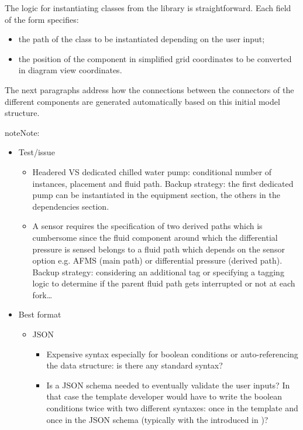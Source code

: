 \documentclass[letterpaper,10pt, openany,english]{sphinxmanual}
\begin{document}
The logic for instantiating classes from the library is straightforward. Each field of the form specifies:
\begin{itemize}
\item {} 
the path of the class to be instantiated depending on the user input;

\item {} 
the position of the component in simplified grid coordinates to be converted in diagram view coordinates.

\end{itemize}

The next paragraphs address how the connections between the connectors of the different components are generated automatically based on this initial model structure.

\begin{sphinxadmonition}{note}{Note:}\begin{itemize}
\item {} 
Test/issue
\begin{itemize}
\item {} 
Headered VS dedicated chilled water pump: conditional number of instances, placement and fluid path. Backup strategy: the first dedicated pump can be instantiated in the equipment section, the others in the dependencies section.

\item {} 
A  sensor requires the specification of two derived paths which is cumbersome since the fluid component around which the differential pressure is sensed belongs to a fluid path which depends on the sensor option e.g. AFMS (main path) or differential pressure (derived path). Backup strategy: considering an additional  tag or specifying a tagging logic to determine if the parent fluid path gets interrupted or not at each fork…

\end{itemize}

\item {} 
Best format
\begin{itemize}
\item {} 
JSON
\begin{itemize}
\item {} 
Expensive syntax especially for boolean conditions or auto-referencing the data structure: is there any standard syntax?

\item {} 
Is a JSON schema needed to eventually validate the user inputs? In that case the template developer would have to write the boolean conditions twice with two different syntaxes: once in the template and once in the JSON schema (typically with the   introduced in )?


\end{itemize}
\end{itemize}
\end{itemize}
\end{sphinxadmonition}
\end{document}
